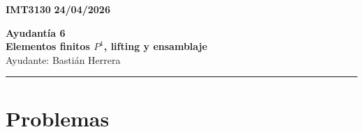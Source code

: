 \documentclass[11pt]{article}
\theoremstyle{thmstyle}
\begin{document}
    \begin{flushleft}
        \small
        \vspace{1pt}
        \textbf{IMT3130} \hfill
        \textbf{24/04/2026}
    \end{flushleft}
    \begin{center}
        \LARGE\textbf{Ayudant\'ia 6}\\
        \vspace{3pt}
        \normalsize\textbf{Elementos finitos $P^1$, lifting y ensamblaje}\\
        \normalsize Ayudante: Basti\'an Herrera 
        \rule{\textwidth}{0.05mm}
    \end{center}

\section*{Problemas}
\end{document}
